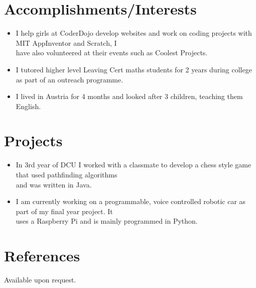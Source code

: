 \documentclass[10pt, letterpaper]{article}
\begin{document}
\section{Accomplishments/Interests}
\begin{itemize}
  \item I help girls at CoderDojo develop websites and work on coding projects with MIT AppInventor and Scratch, I \\ 
  have also volunteered at their events such as Coolest Projects.
  \item I tutored higher level Leaving Cert maths students for 2 years during college as part of an outreach programme.
  \item I lived in Austria for 4 months and looked after 3 children, teaching them English.\end{itemize}

\section{Projects}
\begin{itemize}
  \item In 3rd year of DCU I worked with a classmate to develop a chess style game that used pathfinding algorithms \\
  and was written in Java.
  \item I am currently working on a programmable, voice controlled robotic car as part of my final year project. It \\
  uses a Raspberry Pi and is mainly programmed in Python.\end{itemize}
\section{References}
Available upon request.
\end{document}
